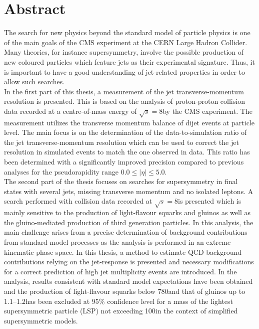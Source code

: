 \section*{Abstract}
The search for new physics beyond the standard model of particle physics is one of the main goals of the CMS experiment at the CERN Large Hadron Collider. Many theories, for instance supersymmetry, involve the possible production of new coloured particles which feature jets as their experimental signature. Thus, it is important to have a good understanding of jet-related properties in order to allow such searches.\\
In the first part of this thesis, a measurement of the jet transverse-momentum resolution is presented. This is based on the analysis of proton-proton collision data recorded at a centre-of-mass energy of $\sqrt{s}=8$\tev by the CMS experiment. The measurement utilizes the transverse momentum balance of dijet events at particle level. The main focus is on the determination of the data-to-simulation ratio of the jet transverse-momentum resolution which can be used to correct the jet resolution in simulated events to match the one observed in data. This ratio has been determined with a significantly improved precision compared to previous analyses for the pseudorapidity range $0.0 \leq |\eta| \leq 5.0$. \\ 
The second part of the thesis focuses on searches for supersymmetry in final states with several jets, missing transverse momentum and no isolated leptons. A search performed with collision data recorded at $\sqrt{s}=8$\tev is presented which is mainly sensitive to the production of light-flavour squarks and gluinos as well as the gluino-mediated production of third generation particles. In this analysis, the main challenge arises from a precise determination of background contributions from standard model processes as the analysis is performed in an extreme kinematic phase space. In this thesis, a method to estimate QCD background contributions relying on the jet-\pt response is presented and necessary modifications for a correct prediction of high jet multiplicity events are introduced. In the analysis, results consistent with standard model expectations have been obtained and the production of light-flavour squarks below 780\gev and that of gluinos up to 1.1--1.2\tev has been excluded at $95\%$ confidence level for a mass of the lightest supersymmetric particle (LSP) not exceeding 100\gev in the context of simplified supersymmetric models. \\
